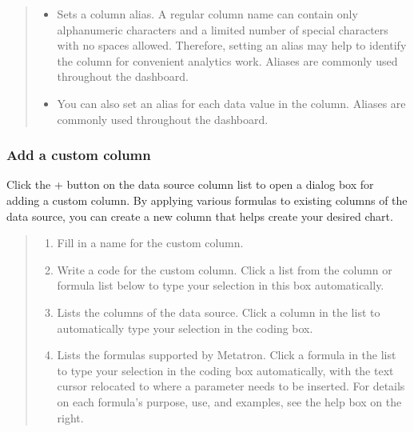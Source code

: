 \documentclass[letterpaper,10pt,english]{sphinxmanual}
\begin{document}
\begin{quote}
\begin{enumerate}
\begin{itemize}
\item {} 
 Sets a column alias. A regular column name can contain only alphanumeric characters and a limited number of special characters with no spaces allowed. Therefore, setting an alias may help to identify the column for convenient analytics work. Aliases are commonly used throughout the dashboard.

\item {} 
 You can also set an alias for each data value in the column. Aliases are commonly used throughout the dashboard.

\end{itemize}

\end{enumerate}
\end{quote}


\subsubsection{Add a custom column}
\label{\detokenize{discovery/part04/composition_of_the_data_column_list:id3}}
Click the + button on the data source column list to open a dialog box for adding a custom column. By applying various formulas to existing columns of the data source, you can create a new column that helps create your desired chart.
\begin{quote}

\begin{figure}[H]
\centering

\noindent{}
\end{figure}
\begin{enumerate}
\def\theenumi{\arabic{enumi}}
\def\labelenumi{\theenumi .}
\makeatletter\def\p@enumii{\p@enumi \theenumi .}\makeatother
\item {} 
 Fill in a name for the custom column.

\item {} 
 Write a code for the custom column. Click a list from the column or formula list below to type your selection in this box automatically.

\item {} 
 Lists the columns of the data source. Click a column in the list to automatically type your selection in the coding box.

\item {} 
 Lists the formulas supported by Metatron. Click a formula in the list to type your selection in the coding box automatically, with the text cursor relocated to where a parameter needs to be inserted. For details on each formula’s purpose, use, and examples, see the help box on the right.

\end{enumerate}
\end{quote}
\end{document}
